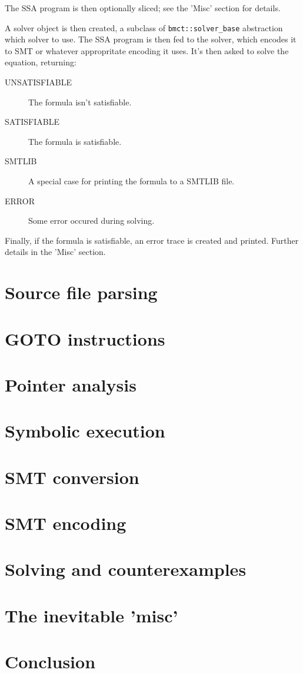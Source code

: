 \documentclass{article}
\begin{document}
The SSA program is then optionally sliced; see the 'Misc' section for details.

A solver object is then created, a subclass of \texttt{bmct::solver\_base}
abstraction which solver to use. The SSA program is then fed to the solver,
which encodes it to SMT or whatever appropritate encoding it uses. It's then
asked to solve the equation, returning:
\begin{description}
\item[UNSATISFIABLE] The formula isn't satisfiable.
\item[SATISFIABLE] The formula is satisfiable.
\item[SMTLIB] A special case for printing the formula to a SMTLIB file.
\item[ERROR] Some error occured during solving.
\end{description}

Finally, if the formula is satisfiable, an error trace is created and printed.
Further details in the 'Misc' section.

\section{Source file parsing}
\section{GOTO instructions}
\section{Pointer analysis}
\section{Symbolic execution}
\section{SMT conversion}
\section{SMT encoding}
\section{Solving and counterexamples}
\section{The inevitable 'misc'}
\section{Conclusion}
\end{document}
